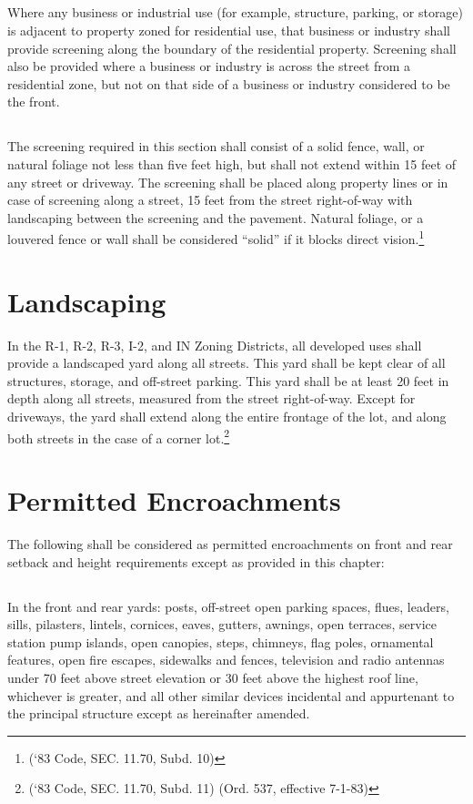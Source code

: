\subsection{}
Where any business or industrial use (for example, structure, parking, or storage) is adjacent to property zoned for residential use, that business or industry shall provide screening along the boundary of the residential property. Screening shall also be provided where a business or industry is across the street from a residential zone, but not on that side of a business or industry considered to be the front.
\subsection{}
The screening required in this section shall consist of a solid fence, wall, or natural foliage not less than five feet high, but shall not extend within 15 feet of any street or driveway. The screening shall be placed along property lines or in case of screening along a street, 15 feet from the street right-of-way with landscaping between the screening and the pavement. Natural foliage, or a louvered fence or wall shall be considered “solid” if it blocks direct vision.\footnote{(‘83 Code, SEC. 11.70, Subd. 10)}
\section{Landscaping}
In the R-1, R-2, R-3, I-2, and IN Zoning Districts, all developed uses shall provide a landscaped yard along all streets.  This yard shall be kept clear of all structures, storage, and off-street parking.  This yard shall be at least 20 feet in depth along all streets, measured from the street right-of-way.  Except for driveways, the yard shall extend along the entire frontage of the lot, and along both streets in the case of a corner lot.\footnote{(‘83 Code, SEC. 11.70, Subd. 11)  (Ord. 537, effective 7-1-83)}
\section{Permitted Encroachments}
The following shall be considered as permitted encroachments on front and rear setback and height requirements except as provided in this chapter:
\subsection{}
In the front and rear yards:  posts, off-street open parking spaces, flues, leaders, sills, pilasters, lintels, cornices, eaves, gutters, awnings, open terraces, service station pump islands, open canopies, steps, chimneys, flag poles, ornamental features, open fire escapes, sidewalks and fences, television and radio antennas under 70 feet above street elevation or 30 feet above the highest roof line, whichever is greater, and all other similar devices incidental and appurtenant to the principal structure except as hereinafter amended.

